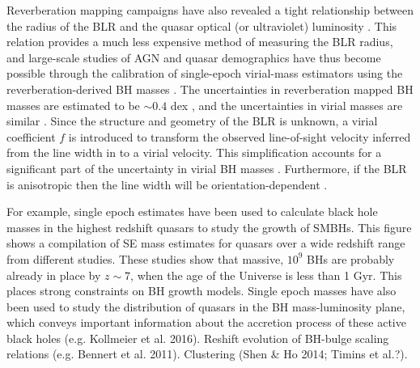 Reverberation mapping campaigns have also revealed a tight relationship between the radius of the BLR and the quasar optical (or ultraviolet) luminosity \citep[the $R-L$ relation; e.g.][]{kaspi00,kaspi07}.
This relation provides a much less expensive method of measuring the BLR radius, and large-scale studies of AGN and quasar demographics have thus become possible through the calibration of single-epoch virial-mass estimators using the reverberation-derived BH masses \citep[e.g.][]{greene05,vestergaard06,vestergaard09,shen11,shen12,trakhtenbrot12}.
The uncertainties in reverberation mapped BH masses are estimated to be $\sim 0.4$ dex \citep[e.g.][]{peterson10}, and the uncertainties in virial masses are similar \citep[e.g.][]{vestergaard06}.
Since the structure and geometry of the BLR is unknown, a virial coefficient $f$ is introduced to transform the observed line-of-sight velocity inferred from the line width in to a virial velocity.
This simplification accounts for a significant part of the uncertainty in virial BH masses \citep[in addition to, for example, describing the BLR with a single radius $R$ and scatter in the $R-L$ relation;][]{shen13}. 
Furthermore, if the BLR is anisotropic \citep[for example, in a flattened disk; e.g.][]{jarvis06} then the line width will be orientation-dependent \citep[e.g.][]{runnoe13b,shen14,brotherton15}. 

For example, single epoch estimates have been used to calculate black hole masses in the highest redshift quasars to study the growth of SMBHs. 
This figure shows a compilation of SE mass estimates for quasars over a wide redshift range from different studies. These studies show that massive, $10^9$ BHs are probably already in place by $z\sim7$, when the age of the Universe is less than 1 Gyr.
This places strong constraints on BH growth models. 
Single epoch masses have also been used to study the distribution of quasars in the BH mass-luminosity plane, which conveys important information about the accretion process of these active black holes (e.g. Kollmeier et al. 2016). 
Reshift evolution of BH-bulge scaling relations (e.g. Bennert et al. 2011). 
Clustering (Shen \& Ho 2014; Timins et al.?). 